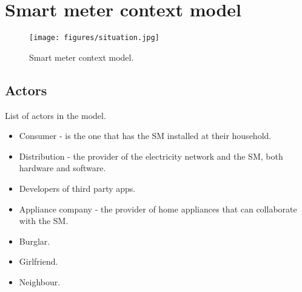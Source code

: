 \section{Smart meter context model}
\begin{figure}
  \texttt{[image: figures/situation.jpg]}
  \caption{Smart meter context model.}
  \label{sm_model}
\end{figure}

\subsection{Actors}
List of actors in the model.
\begin{itemize}
\item Consumer - is the one that has the SM installed at their household.
\item Distribution - the provider of the electricity network and the SM, both hardware and software.
\item Developers of third party apps.
\item Appliance company - the provider of home appliances that can collaborate with the SM.
\item Burglar.
\item Girlfriend.
\item Neighbour.
\end{itemize}

